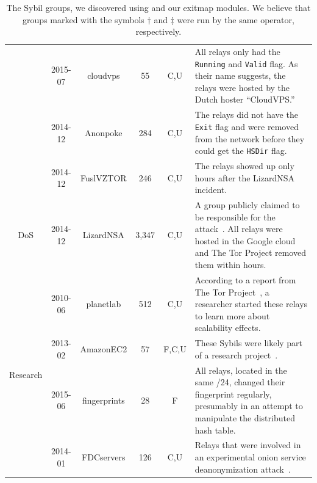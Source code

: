 \begin{table}[t]
\begin{tabularx}{\textwidth}{c|c c c c X}
& 2015-07 & cloudvps & 55 & C,U & All relays only had the \texttt{Running} and
\texttt{Valid} flag.  As their name suggests, the relays were hosted by the
Dutch hoster ``CloudVPS.'' \\

& 2014-12 & Anonpoke & 284 & C,U & The relays did not have the \texttt{Exit} flag
and were removed from the network before they could get the \texttt{HSDir} flag.
\\

& 2014-12 & FuslVZTOR & 246 & C,U & The relays showed up only hours after the
LizardNSA incident. \\

\hline

\multirow{1}{*}{DoS}
& 2014-12 & LizardNSA & 3,347 & C,U & A group publicly claimed to be responsible
for the attack~\cite{lizards}.  All relays were hosted in the Google cloud and
The Tor Project removed them within hours. \\

\hline

\multirow{4}{*}{Research}
& 2010-06 & planetlab & 512 & C,U & According to a report from The Tor
Project~\cite{progressreport}, a researcher started these relays to learn more
about scalability effects. \\

& 2013-02 & AmazonEC2 & 57 & F,C,U & These Sybils were likely part of a research
project~\cite{Biryukov2013a}. \\

& 2015-06 & fingerprints & 28 & F & All relays, located in the same /24, changed
their fingerprint regularly, presumably in an attempt to manipulate the
distributed hash table. \\

& 2014-01 & FDCservers & 126 & C,U & Relays that were involved in an
experimental onion service deanonymization attack~\cite{cmucert}. \\
\hline

\end{tabularx}
\caption{The Sybil groups, we discovered using \sys and our exitmap
modules.  We believe that groups marked with the
symbols $\dagger$ and $\ddagger$ were run by the same operator, respectively.}
\label{tab:sybils}
\end{table}

